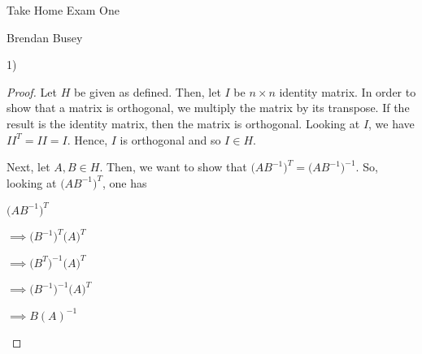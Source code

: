 \documentclass[executivepaper]{article}
\begin{document}
\vspace*{-40mm}

\begin{center}

Take Home Exam One

\end{center}

\begin{flushright}

Brendan Busey

\end{flushright}

\begin{flushleft}

1) 

\begin{center}

\begin{proof}

Let $H$ be given as defined. Then, let $I$ be $n \times n$ identity matrix. In order to show that a matrix is orthogonal, we multiply the matrix by its transpose. If the result is the identity matrix, then the matrix is orthogonal. 
Looking at $I$, we have $II^{T}=II=I$. Hence, $I$ is orthogonal and so $I \in H$.

\vspace{5mm}

Next, let $A, B \in H$. Then, we want to show that $\Big(AB^{-1}\Big)^{T}=\Big(AB^{-1}\Big)^{-1}$. So, looking at $\Big(AB^{-1}\Big)^{T}$, one has

\begin{center}

$\Big(AB^{-1}\Big)^{T}$

\vspace{3mm}

$\implies \Big(B^{-1}\Big)^{T}\Big(A\Big)^{T}$

\vspace{3mm}

$\implies \Big(B^{T}\Big)^{-1}\Big(A\Big)^{T}$

\vspace{3mm}

$\implies \Big(B^{-1}\Big)^{-1}\Big(A\Big)^{T}$

\vspace{3mm}

$\implies B(A)^{-1}$

\end{center}

\vspace{5mm}


\end{proof}
\end{center}
\end{flushleft}
\end{document}
